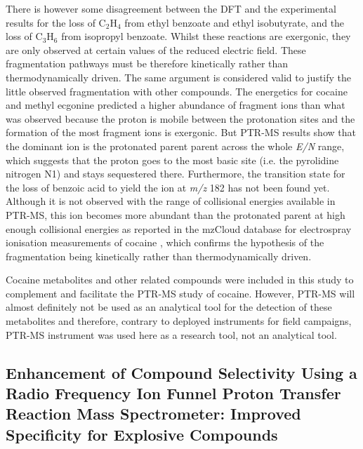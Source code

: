 There is however  some disagreement between the DFT and the experimental results  for the loss of C$_2$H$_4$ from ethyl benzoate and ethyl isobutyrate, and the loss of C$_3$H$_6$ from isopropyl benzoate.
%
Whilst these reactions are exergonic, they are only observed at certain values of the reduced electric field.
%
These fragmentation pathways must be therefore kinetically rather than thermodynamically driven.
%
The same argument is considered valid to justify the little observed fragmentation with other compounds.
%
The energetics for cocaine and methyl ecgonine predicted a higher abundance of fragment ions than what was observed because the proton is mobile between the protonation sites and the formation of the most fragment ions is exergonic.
%
But PTR-MS results show that the dominant ion is the protonated parent parent across the whole \textit{E/N} range, which suggests that the proton goes to the most basic site (i.e. the pyrolidine nitrogen N1) and stays sequestered there.
%
Furthermore, the transition state for the loss of benzoic acid to yield the ion at \textit{m/z} 182 has not been found yet.
%
Although it is not observed with the range of collisional energies available in PTR-MS, this ion becomes more abundant than the protonated parent at high enough collisional energies as reported in the mzCloud database for electrospray ionisation measurements of cocaine \cite{mzcloudCOC}, which confirms the hypothesis of the fragmentation being kinetically rather than thermodynamically driven.

Cocaine metabolites and other related compounds were included in this study to complement and facilitate the PTR-MS study of cocaine.
%
However, PTR-MS will almost definitely not be used as an analytical tool for the detection of these metabolites and therefore, contrary to  deployed instruments for field campaigns,  PTR-MS instrument was used here as a research tool, not an analytical tool.


\newpage
\subsection{Enhancement of Compound Selectivity Using a Radio Frequency Ion Funnel Proton Transfer Reaction Mass Spectrometer: Improved Specificity for Explosive Compounds}




